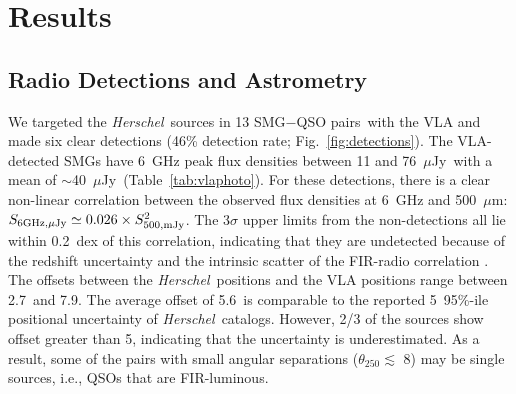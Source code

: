 \documentclass[iop,revtex4,twocolumn,apj,numberedappendix,appendixfloats]{emulateapj}
\newcommand{\hers}{{\it Herschel}}
\newcommand{\um}{$\mu$m}
\newcommand{\uJy}{$\mu$Jy}
\newcommand{\sqps}{SMG$-$QSO pairs}
\begin{document}
\section{Results} \label{sec:result}

\subsection{Radio Detections and Astrometry}


We targeted the \hers\ sources in 13 \sqps\ with the VLA and made six clear detections (46\% detection rate; Fig.~\ref{fig:detections}). The VLA-detected SMGs have 6~GHz peak flux densities between 11 and 76~\uJy\ with a mean of $\sim$40~\uJy\ (Table~\ref{tab:vlaphoto}). For these detections, there is a clear non-linear correlation between the observed flux densities at 6~GHz and 500~\um: 
$S_{\rm 6GHz,\mu Jy} \simeq 0.026 \times S_{\rm 500,mJy}^2$.
The 3$\sigma$ upper limits from the non-detections all lie within 0.2~dex of this correlation, indicating that they are undetected because of the redshift uncertainty and the intrinsic scatter of the FIR-radio
correlation \citep[e.g.][]{Ivison10c}. 
%
%
%
The offsets between the \hers\ positions and the VLA positions range between 2.7\arcsec\ and 7.9\arcsec. The average offset of 5.6\arcsec\ is comparable to the reported 5\arcsec\ 95\%-ile positional uncertainty of \hers\ catalogs. However, 2/3 of the sources show offset greater than 5\arcsec, indicating that the uncertainty is underestimated. As a result, some of the pairs with small angular separations ($\theta_{250} \lesssim$ 8\arcsec) may be single sources, i.e., QSOs that are FIR-luminous.
\end{document}
